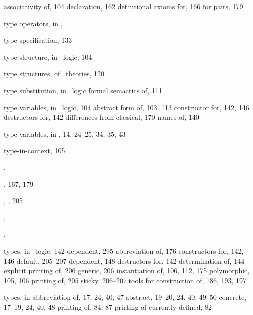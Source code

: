 \begin{theindex}
    \subitem associativity of, 104
    \subitem declaration, 162
    \subitem definitional axioms for, 166
    \subitem for pairs, 179
  \item type operators, in \ML, 
  \item type specification, 133
  \item type structure, in \HOL\ logic, 104
  \item type structures, of \HOL\ theories, 120
  \item type substitution, in \HOL\ logic
    \subitem formal semantics of, 111
  \item type variables, in \HOL\ logic, 104
    \subitem abstract form of, 103, 113
    \subitem constructor for, 142, 146
    \subitem destructors for, 142
    \subitem differences from classical, 170
    \subitem names of, 140
  \item type variables, in \ML, 14, 24--25, 34, 35, 43
  \item type-in-context, 105
  \item {}, 
  \item {}, 167, 179
  \item {}, , 205
  \item {}, 
  \item {}, 
  \item types, in \HOL\ logic, 142
    \subitem  dependent, 295
    \subitem abbreviation of, 176
    \subitem constructors for, 142, 146
    \subitem default, 205--207
    \subitem dependent, 148
    \subitem destructors for, 142
    \subitem determination of, 144
    \subitem explicit printing of, 206
    \subitem generic, 206
    \subitem instantiation of, 106, 112, 175
    \subitem polymorphic, 105, 106
    \subitem printing of, 205
    \subitem sticky, 206--207
    \subitem tools for construction of, 186, 193, 197
  \item types, in \ML
    \subitem abbreviation of, 17, 24, 40, 47
    \subitem abstract, 19--20, 24, 40, 49--50
    \subitem concrete, 17--19, 24, 40, 48
    \subitem printing of, 84, 87
    \subitem printing of currently defined, 82

  \indexspace


\end{theindex}
